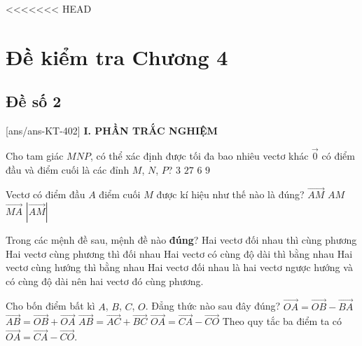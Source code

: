<<<<<<< HEAD
\section*{Đề kiểm tra Chương 4}
\subsection*{Đề số 2}
\setcounter{ex}{0}\setcounter{bt}{0}
[ans/ans-KT-402]
\noindent\textbf{I. PHẦN TRẮC NGHIỆM}
\begin{ex}%
	Cho tam giác $MNP$, có thể xác định được tối đa bao nhiêu vectơ khác $\overrightarrow{0}$ có điểm đầu và điểm cuối là các đỉnh $M$, $N$, $P$?
	\choice
	{$3$}
	{$27$}
	{\True $6$}
	{$9$}
\end{ex}

\begin{ex}%
	Vectơ có điểm đầu $A$ điểm cuối $M$ được kí hiệu như thế nào là đúng?
	\choice
	{\True $\overrightarrow{AM}$}
	{$AM$}
	{$\overrightarrow{MA}$}
	{$\left|\overrightarrow{AM} \right|$}
\end{ex}

\begin{ex}%
	Trong các mệnh đề sau, mệnh đề nào \textbf{đúng}?
	\choice
	{\True Hai vectơ đối nhau thì cùng phương}
	{Hai vectơ cùng phương thì đối nhau}
	{Hai vectơ có cùng độ dài thì bằng nhau}
	{Hai vectơ cùng hướng thì bằng nhau}
	\loigiai
	{Hai vectơ đối nhau là hai vectơ ngược hướng và có cùng độ dài nên hai vectơ đó cùng phương.}
\end{ex}

\begin{ex}%
	Cho bốn điểm bất kì $A$, $B$, $C$, $O$. Đẳng thức nào sau đây đúng?
	\choice
	{$\overrightarrow{OA}= \overrightarrow{OB}-\overrightarrow{BA}$}
	{$\overrightarrow{AB}= \overrightarrow{OB}+\overrightarrow{OA}$}
	{$\overrightarrow{AB}= \overrightarrow{AC}+\overrightarrow{BC}$}
	{\True $\overrightarrow{OA}= \overrightarrow{CA}-\overrightarrow{CO}$}
	\loigiai
	{
		Theo quy tắc ba điểm ta có $\overrightarrow{OA}= \overrightarrow{CA}-\overrightarrow{CO}$.
	}
\end{ex}

